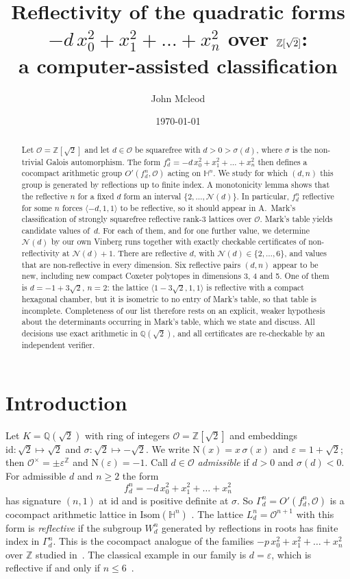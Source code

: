 \documentclass[11pt]{amsart}
\title[{Reflectivity of $-dx_0^2+x_1^2+\dots+x_n^2$ over $\Z[\sqrt2]$}]{Reflectivity of the quadratic forms
$-d\,x_0^2+x_1^2+\dots+x_n^2$ over $\Z[\sqrt2]$:\\ a computer-assisted classification}
\author{John Mcleod}
\date{\today}
\theoremstyle{definition}
\newcommand{\Z}{\mathbb{Z}}
\newcommand{\Q}{\mathbb{Q}}
\newcommand{\Hy}{\mathbb{H}}
\newcommand{\OK}{\mathcal{O}}
\newcommand{\eps}{\varepsilon}
\newcommand{\id}{\mathrm{id}}
\newcommand{\N}{\mathrm{N}}
\newcommand{\Nmax}{\mathcal{N}}
\begin{document}
\begin{abstract}
Let $\OK=\Z[\sqrt2]$ and let $d\in\OK$ be squarefree with $d>0>\sigma(d)$, where $\sigma$ is
the non-trivial Galois automorphism. The form $f_d^n=-d\,x_0^2+x_1^2+\dots+x_n^2$ then defines a
cocompact arithmetic group $O'(f_d^n,\OK)$ acting on $\Hy^n$. We study for which $(d,n)$ this
group is generated by reflections up to finite index. A monotonicity lemma shows that the
reflective $n$ for a fixed $d$ form an interval $\{2,\dots,\Nmax(d)\}$. In particular,
$f_d^n$ reflective for some $n$ forces $\langle -d,1,1\rangle$ to be reflective, so it should
appear in A.~Mark's classification of strongly squarefree reflective rank-3 lattices over
$\OK$. Mark's table yields \NCand{} candidate values of~$d$. For each of them, and for one
further value, we determine $\Nmax(d)$ by our own Vinberg runs together with exactly
checkable certificates of non-reflectivity at $\Nmax(d)+1$. There are \NRefl{} reflective $d$,
with $\Nmax(d)\in\{2,\dots,6\}$, and \NNon{} values that are non-reflective in every dimension.
Six reflective pairs $(d,n)$ appear to be new, including new compact Coxeter polytopes in
dimensions 3, 4 and 5. One of them is $d=-1+3\sqrt2$, $n=2$: the lattice
$\langle 1-3\sqrt2,1,1\rangle$ is reflective with a compact hexagonal chamber, but it is
isometric to no entry of Mark's table, so that table is incomplete. Completeness of our list
therefore rests on an explicit, weaker hypothesis about the determinants occurring in Mark's
table, which we state and discuss. All decisions use exact arithmetic in $\Q(\sqrt2)$, and
all certificates are re-checkable by an independent verifier.
\end{abstract}
\maketitle

\section{Introduction}

Let $K=\Q(\sqrt2)$ with ring of integers $\OK=\Z[\sqrt2]$ and embeddings
$\id\colon\sqrt2\mapsto\sqrt2$ and $\sigma\colon\sqrt2\mapsto-\sqrt2$. We write
$\N(x)=x\,\sigma(x)$ and $\eps=1+\sqrt2$; then $\OK^\times=\pm\eps^{\Z}$ and $\N(\eps)=-1$.
Call $d\in\OK$ \emph{admissible} if $d>0$ and $\sigma(d)<0$. For admissible $d$ and $n\ge2$ the
form
\[
  f_d^n = -d\,x_0^2+x_1^2+\dots+x_n^2
\]
has signature $(n,1)$ at $\id$ and is positive definite at $\sigma$. So
$\Gamma_d^n=O'(f_d^n,\OK)$ is a cocompact arithmetic lattice in $\mathrm{Isom}(\Hy^n)$
\cite{Vin72,Bel16}. The lattice $L_d^n=\OK^{n+1}$ with this form is \emph{reflective} if the
subgroup $W_d^n$ generated by reflections in roots has finite index in $\Gamma_d^n$. This is the
cocompact analogue of the families $-p\,x_0^2+x_1^2+\dots+x_n^2$ over $\Z$ studied
in~\cite{Mc11,McTh,Mar15}. The classical example in our family is $d=\eps$, which is
reflective if and only if $n\le6$~\cite{Bug90}.
\end{document}
